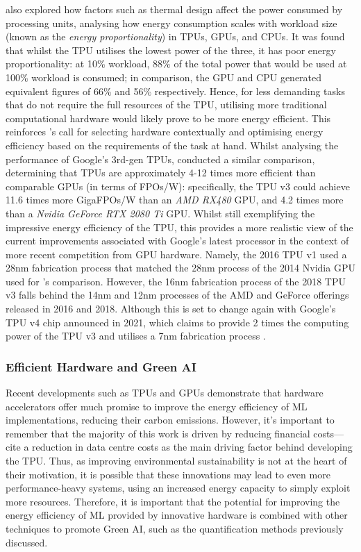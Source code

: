 \documentclass[a4paper, 12pt]{article}
\begin{document}
     also explored how factors such as thermal design affect the power consumed by processing units, analysing how energy consumption scales with workload size (known as the \emph{energy proportionality}) in TPUs, GPUs, and CPUs. It was found that whilst the TPU utilises the lowest power of the three, it has poor energy proportionality: at 10\% workload, 88\% of the total power that would be used at 100\% workload is consumed; in comparison, the GPU and CPU generated equivalent figures of 66\% and 56\% respectively. Hence, for less demanding tasks that do not require the full resources of the TPU, utilising more traditional computational hardware would likely prove to be more energy efficient. This reinforces 's call for selecting hardware contextually and optimising energy efficiency based on the requirements of the task at hand. Whilst analysing the performance of Google's 3rd-gen TPUs,  conducted a similar comparison, determining that TPUs are approximately 4-12 times more efficient than comparable GPUs (in terms of FPOs/W): specifically, the TPU v3 could achieve 11.6 times more GigaFPOs/W than an \emph{AMD RX480} GPU, and 4.2 times more than a \emph{Nvidia GeForce RTX 2080 Ti} GPU. Whilst still exemplifying the impressive energy efficiency of the TPU, this provides a more realistic view of the current improvements associated with Google's latest processor in the context of more recent competition from GPU hardware. Namely, the 2016 TPU v1 used a 28nm fabrication process that matched the 28nm process of the 2014 Nvidia GPU used for 's comparison. However, the 16nm fabrication process of the 2018 TPU v3 falls behind the 14nm and 12nm processes of the AMD and GeForce offerings released in 2016 and 2018. Although this is set to change again with Google's TPU v4 chip announced in 2021, which claims to provide 2 times the computing power of the TPU v3 and utilises a 7nm fabrication process \cite{wang-selvan-2021}.

    \subsubsection{Efficient Hardware and Green AI}

    Recent developments such as TPUs and GPUs demonstrate that hardware accelerators offer much promise to improve the energy efficiency of ML implementations, reducing their carbon emissions. However, it's important to remember that the majority of this work is driven by reducing financial costs--- cite a reduction in data centre costs as the main driving factor behind developing the TPU. Thus, as improving environmental sustainability is not at the heart of their motivation, it is possible that these innovations may lead to even more performance-heavy systems, using an increased energy capacity to simply exploit more resources. Therefore, it is important that the potential for improving the energy efficiency of ML provided by innovative hardware is combined with other techniques to promote Green AI, such as the quantification methods previously discussed.
\end{document}
